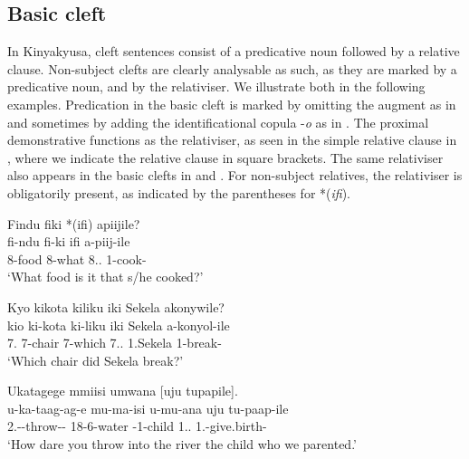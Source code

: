 \documentclass[output=paper]{langscibook}
\begin{document}
\z

\subsection{Basic cleft}
\label{bkm:Ref122533658}
In Kinyakyusa, cleft sentences consist of a predicative noun followed by a relative clause. Non-subject clefts are clearly analysable as such, as they are marked by a predicative noun, and by the relativiser. We illustrate both in the following examples. Predication in the basic cleft is marked by omitting the augment as in  and sometimes by adding the identificational copula -\textit{o} as in . The proximal demonstrative functions as the relativiser, as seen in the simple relative clause in , where we indicate the relative clause in square brackets. The same relativiser also appears in the basic clefts in  and . For non-subject relatives, the relativiser is obligatorily present, as indicated by the parentheses for *(\textit{ifi}).

\ea
\label{bkm:Ref122534076}
\label{bkm:Ref148771161}Findu fiki *(ifi) apiijile?\\
\gll
fi-ndu  fi-ki  ifi  a-piij-ile\\
8-food  8-what  8.\DEM.\PROX{}  1\SM{}-cook-\PFV{}\\
\glt
‘What food is it that s/he cooked?’\\

\z


\ea
\label{bkm:Ref98081032}
Kyo kikota kiliku iki Sekela akonywile?\\
\gll
kio  ki-kota  ki-liku  iki  Sekela  a-konyol-ile\\
7.\IDCOP{}  7-chair  7-which  7.\DEM.\PROX{}  1.Sekela  1\SM{}-break-\PFV{}\\
\glt
‘Which chair did Sekela break?’\\

\z

\ea
Ukatagege mmiisi umwana [uju tupapile].\\
\gll
u-ka-taag-ag-e  mu-ma-isi  u-mu-ana uju  tu-paap-ile  \\
2\SG.\SM-\NEG{}-throw-\HAB-\SBJV{}  18-6-water  \AUG{}-1-child 1.\DEM.\PROX{}  1\PL.\SM{}-give.birth-\PFV{}\\
\glt ‘How dare you throw into the river the child who we parented.’
\end{document}
